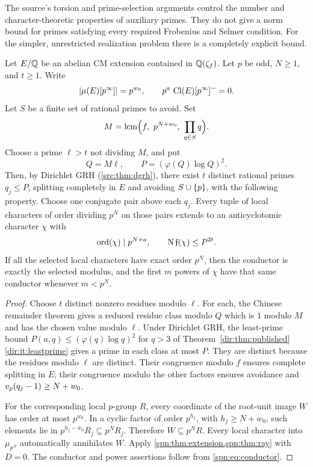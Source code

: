 The source's torsion and prime-selection arguments control the number and
character-theoretic properties of auxiliary primes. They do not give a norm
bound for primes satisfying every required Frobenius and Selmer condition.
For the simpler, unrestricted realization problem there is a completely
explicit bound.

\begin{theorem}\label{spn:thm:bounded-conductor}
Let $E/\mathbb{Q}$ be an abelian CM extension contained in $\mathbb{Q}(\zeta_f)$. Let $p$ be
odd, $N\ge1$, and $t\ge1$. Write
\[
 \lvert\mu(E)[p^\infty]\rvert=p^{w_0},\qquad p^a\,\operatorname{Cl}(E)[p^\infty]^{-}=0 .
\]
Let $S$ be a finite set of rational primes to avoid. Set
\[
 M=\operatorname{lcm}\Bigl(f,\ p^{N+w_0},\ \prod_{q\in S}q\Bigr).
\]
Choose a prime $\ell>t$ not dividing $M$, and put
\[
 Q=M\ell,\qquad P=(\varphi(Q)\log Q)^2 .
\]
Then, by Dirichlet GRH (\cref{src:thm:dgrh}), there exist $t$ distinct
rational primes $q_j\le P$, splitting completely in $E$ and avoiding $S\cup\{p\}$, with the following property.
Choose one conjugate pair above each $q_j$. Every tuple of local characters
of order dividing $p^N$ on those pairs extends to an anticyclotomic character
$\chi$ with
\[
 \operatorname{ord}(\chi)\mid p^{N+a},\qquad\operatorname{N}\mathfrak f(\chi)\le P^{2t}.
\]
If all the selected local characters have exact order $p^N$, then the
conductor is exactly the selected modulus, and the first $m$ powers of $\chi$
have that same conductor whenever $m<p^N$.
\end{theorem}

\begin{proof}
Choose $t$ distinct nonzero residues modulo $\ell$. For each, the Chinese
remainder theorem gives a reduced residue class modulo $Q$ which is $1$
modulo $M$ and has the chosen value modulo $\ell$. Under Dirichlet GRH, the
least-prime bound $P(a,q)\le(\varphi(q)\log q)^2$ for $q>3$ of
Theorem~\ref{dir:thm:published}\ref{dir:it:leastprime} gives a prime in each class at most $P$.
 They are distinct because the residues modulo $\ell$ are distinct.
Their congruence modulo $f$ ensures complete splitting in $E$; their
congruence modulo the other factors ensures avoidance and
$v_p(q_j-1)\ge N+w_0$.

For the corresponding local $p$-group $R$, every coordinate of the root-unit
image $W$ has order at most $p^{w_0}$. In a cyclic factor of order
$p^{h_j}$, with $h_j\ge N+w_0$, such elements lie in
$p^{h_j-w_0}R_j\subseteq p^NR_j$. Therefore $W\subseteq p^NR$. Every local
character into $\mu_{p^N}$ automatically annihilates $W$. Apply
\cref{spn:thm:extension,spn:thm:ray} with $D=0$. The conductor and power
assertions follow from \eqref{spn:eq:conductor}.
\end{proof}

